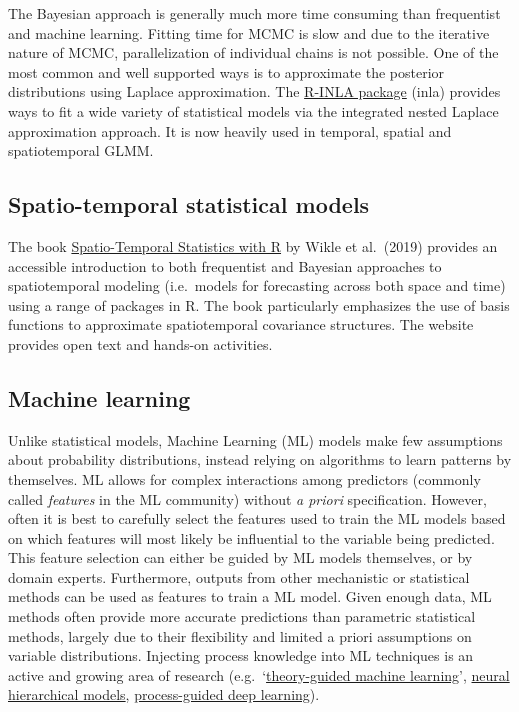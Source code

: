 \documentclass[
]{book}
\begin{document}
The Bayesian approach is generally much more time consuming than frequentist and machine learning. Fitting time for MCMC is slow and due to the iterative nature of MCMC, parallelization of individual chains is not possible. One of the most common and well supported ways is to approximate the posterior distributions using Laplace approximation. The \href{http://www.r-inla.org/}{R-INLA package} (inla) provides ways to fit a wide variety of statistical models via the integrated nested Laplace approximation approach. It is now heavily used in temporal, spatial and spatiotemporal GLMM.

\hypertarget{spatio-temporal-statistical-models}{%
\subsection{Spatio-temporal statistical models}\label{spatio-temporal-statistical-models}}

The book \href{https://spacetimewithr.org/}{Spatio-Temporal Statistics with R} by Wikle et al.~(2019) provides an accessible introduction to both frequentist and Bayesian approaches to spatiotemporal modeling (i.e.~models for forecasting across both space and time) using a range of packages in R. The book particularly emphasizes the use of basis functions to approximate spatiotemporal covariance structures. The website provides open text and hands-on activities.

\hypertarget{machine-learning}{%
\subsection{Machine learning}\label{machine-learning}}

Unlike statistical models, Machine Learning (ML) models make few assumptions about probability distributions, instead relying on algorithms to learn patterns by themselves. ML allows for complex interactions among predictors (commonly called \emph{features} in the ML community) without \emph{a priori} specification. However, often it is best to carefully select the features used to train the ML models based on which features will most likely be influential to the variable being predicted. This feature selection can either be guided by ML models themselves, or by domain experts. Furthermore, outputs from other mechanistic or statistical methods can be used as features to train a ML model. Given enough data, ML methods often provide more accurate predictions than parametric statistical methods, largely due to their flexibility and limited a priori assumptions on variable distributions. Injecting process knowledge into ML techniques is an active and growing area of research (e.g.~`\href{https://ieeexplore.ieee.org/abstract/document/7959606}{theory-guided machine learning}', \href{https://onlinelibrary.wiley.com/doi/full/10.1111/ele.13462?casa_token=qVMfHetF3hsAAAAA\%3A1XJBLU1VLvNDPEPfGIXybcYcr2jb86Foy8twEkHpk_yVVySg_FtalJVDECQxdS-28OYeBqCF4s4tGiiJ}{neural hierarchical models}, \href{https://agupubs.onlinelibrary.wiley.com/doi/full/10.1029/2019WR024922}{process-guided deep learning}).
\end{document}
